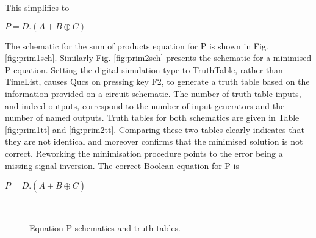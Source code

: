 This simplifies to\\
\begin{center}
\begin{large}$P=D.(A+B \oplus C )$\end{large}
\end{center}
The schematic for the sum of products equation for P is shown in
Fig. \ref{fig:prim1sch}.  Similarly Fig. \ref{fig:prim2sch} presents
the schematic for a minimised P equation.  Setting the digital
simulation type to TruthTable, rather than TimeList, causes Qucs on
pressing key F2, to generate a truth table based on the information
provided on a circuit schematic. The number of truth table inputs, and
indeed outputs, correspond to the number of input generators and the
number of named outputs. Truth tables for both schematics are given in
Table \ref{fig:prim1tt} and \ref{fig:prim2tt}. Comparing these two
tables clearly indicates that they are not identical and moreover
confirms that the minimised solution is not correct.  Reworking the
minimisation procedure points to the error being a missing signal
inversion.  The correct Boolean equation for P is

\begin{center}
\begin{large}$P=D.(\overline{A}+B \oplus C )$\end{large}
\end{center}

\begin{figure}
  \centering
{}
\end{figure}
\FloatBarrier

\begin{figure}
  \centering
{}
\\
\caption{Equation P schematics and truth tables.}
\end{figure}
\FloatBarrier


